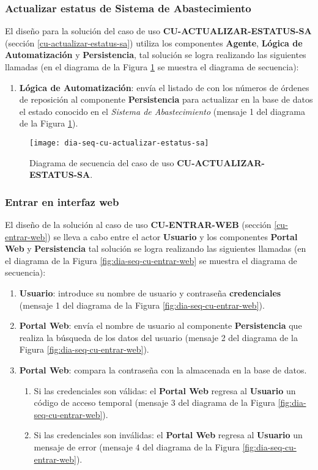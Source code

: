 \subsubsection{Actualizar estatus de Sistema de Abastecimiento}
El diseño para la solución del caso de uso \textbf{CU-ACTUALIZAR-ESTATUS-SA} (sección \ref{cu-actualizar-estatus-sa}) utiliza los componentes \textbf{Agente}, \textbf{Lógica de Automatización} y \textbf{Persistencia}, tal solución se logra realizando las siguientes llamadas (en el diagrama de la Figura \ref{fig:dia-seq-cu-actualizar-estatus-sa} se muestra el diagrama de secuencia):
\begin{enumerate}
	\item \textbf{Lógica de Automatización}: envía el listado de con los números de órdenes de reposición al componente \textbf{Persistencia} para actualizar en la base de datos el estado conocido en el \textit{Sistema de Abastecimiento} (mensaje 1 del diagrama de la Figura \ref{fig:dia-seq-cu-actualizar-estatus-sa}).
\end{enumerate}

\begin{figure}[h]
	\centering
	\texttt{[image: dia-seq-cu-actualizar-estatus-sa]}
	\caption{Diagrama de secuencia del caso de uso \textbf{CU-ACTUALIZAR-ESTATUS-SA}.}
	\label{fig:dia-seq-cu-actualizar-estatus-sa}
\end{figure}

\subsubsection{Entrar en interfaz web}
El diseño de la solución al caso de uso \textbf{CU-ENTRAR-WEB} (sección \ref{cu-entrar-web}) se lleva a cabo entre el actor \textbf{Usuario} y los componentes \textbf{Portal Web} y \textbf{Persistencia} tal solución se logra realizando las siguientes llamadas (en el diagrama de la Figura \ref{fig:dia-seq-cu-entrar-web} se muestra el diagrama de secuencia):
\begin{enumerate}
	\item \textbf{Usuario}: introduce su nombre de usuario y contraseña \textbf{credenciales} (mensaje 1 del diagrama de la Figura \ref{fig:dia-seq-cu-entrar-web}).
	\item \textbf{Portal Web}: envía el nombre de usuario al componente \textbf{Persistencia} que realiza la búsqueda de los datos del usuario (mensaje 2 del diagrama de la Figura \ref{fig:dia-seq-cu-entrar-web}).
	\item \textbf{Portal Web}: compara la contraseña con la almacenada en la base de datos.
	\begin{enumerate}
		\item Si las credenciales son válidas: el \textbf{Portal Web} regresa al \textbf{Usuario} un código de acceso temporal (mensaje 3 del diagrama de la Figura \ref{fig:dia-seq-cu-entrar-web}).
		\item Si las credenciales son inválidas: el \textbf{Portal Web} regresa al \textbf{Usuario} un mensaje de error (mensaje 4 del diagrama de la Figura \ref{fig:dia-seq-cu-entrar-web}).
	\end{enumerate}
\end{enumerate}

